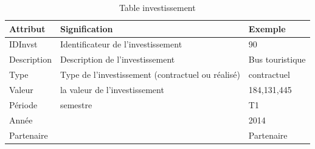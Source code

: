 \documentclass[a4paper]{report}
\begin{document}
\begin{doublespace}
	\begin{table}[H]
		\begin{center}
			\begin{tabularx}{17.5cm}{|p{4cm}|X|p{4cm}|}
				\hline
				\textbf{Attribut} & \textbf{Signification}                            &
				\textbf{Exemple}                                                                    \\
				\hline
				IDInvst           & Identificateur de l'investissement                & 90          \\
				\hline
				Description       & Description de l'investissement                    & Bus
				touristique                                                                         \\
				\hline
				Type              & Type de l'investissement (contractuel ou réalisé) &
				contractuel                                                                         \\
				\hline
				Valeur            & la valeur de l'investissement                     & 184,131,445 \\
				\hline
				Période           & semestre                                          & T1          \\
				\hline
				Année             &                                                   & 2014        \\
				\hline
				Partenaire        &                                                   & Partenaire  \\
				\hline
			\end{tabularx}
			\caption{Table investissement}
		\end{center}
	\end{table}


\end{doublespace}
\end{document}
